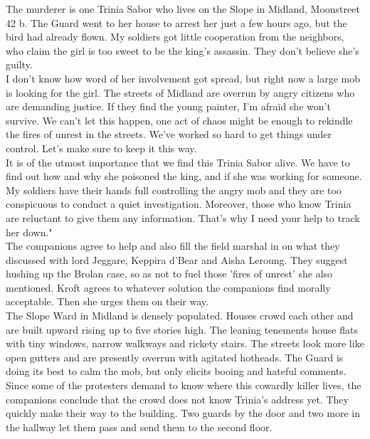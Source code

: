 The murderer is one Trinia Sabor who lives on the Slope in Midland, Moonstreet 42 b. The Guard went to her house to arrest her just a few hours ago, but the bird had already flown. My soldiers got little cooperation from the neighbors, who claim the girl is too sweet to be the king's assassin. They don't believe she's guilty.\\

I don't know how word of her involvement got spread, but right now a large mob is looking for the girl. The streets of Midland are overrun by angry citizens who are demanding justice. If they find the young painter, I'm afraid she won't survive. We can't let this happen, one act of chaos might be enough to rekindle the fires of unrest in the streets. We've worked so hard to get things under control. Let's make sure to keep it this way.\\

It is of the utmost importance that we find this Trinia Sabor alive. We have to find out how and why she poisoned the king, and if she was working for someone. My soldiers have their hands full controlling the angry mob and they are too conspicuous to conduct a quiet investigation. Moreover, those who know Trinia are reluctant to give them any information. That's why I need your help to track her down."\\

The companions agree to help and also fill the field marshal in on what they discussed with lord Jeggare, Keppira d'Bear and Aisha Leroung. They suggest hushing up the Brolan case, so as not to fuel those 'fires of unrest' she also mentioned. Kroft agrees to whatever solution the companions find morally acceptable. Then she urges them on their way.\\

The Slope Ward in Midland is densely populated. Houses crowd each other and are built upward rising up to five stories high. The leaning tenements house flats with tiny windows, narrow walkways and rickety stairs. The streets look more like open gutters and are presently overrun with agitated hotheads. The Guard is doing its best to calm the mob, but only elicits booing and hateful comments. Since some of the protesters demand to know where this cowardly killer lives, the companions conclude that the crowd does not know Trinia's address yet. They quickly make their way to the building. Two guards by the door and two more in the hallway let them pass and send them to the second floor.\\

